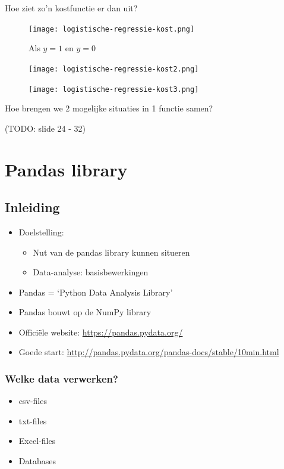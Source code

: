 \documentclass{article}
\begin{document}
Hoe ziet zo'n kostfunctie er dan uit?

\begin{figure}[H]
    \centering
    \texttt{[image: logistische-regressie-kost.png]}
    \caption{Als $y = 1$ en $y = 0$}
\end{figure}

\begin{figure}[H]
    \centering
    \texttt{[image: logistische-regressie-kost2.png]}
    \caption{}
\end{figure}

\begin{figure}[H]
    \centering
    \texttt{[image: logistische-regressie-kost3.png]}
    \caption{}
\end{figure}

Hoe brengen we 2 mogelijke situaties in 1 functie samen?


(TODO: slide 24 - 32)


\section{Pandas library}

\subsection{Inleiding}

\begin{itemize}
    \item Doelstelling:
    \begin{itemize}
        \item Nut van de pandas library kunnen situeren
        \item Data-analyse: basisbewerkingen
    \end{itemize}
    \item Pandas = `Python Data Analysis Library'
    \item Pandas bouwt op de NumPy library
    \item Officiële website: \url{https://pandas.pydata.org/}
    \item Goede start: \url{http://pandas.pydata.org/pandas-docs/stable/10min.html} 
\end{itemize}

\subsubsection{Welke data verwerken?}

\begin{itemize}
    \item csv-files
    \item txt-files
    \item Excel-files
    \item Databases
\end{itemize}
\end{document}
